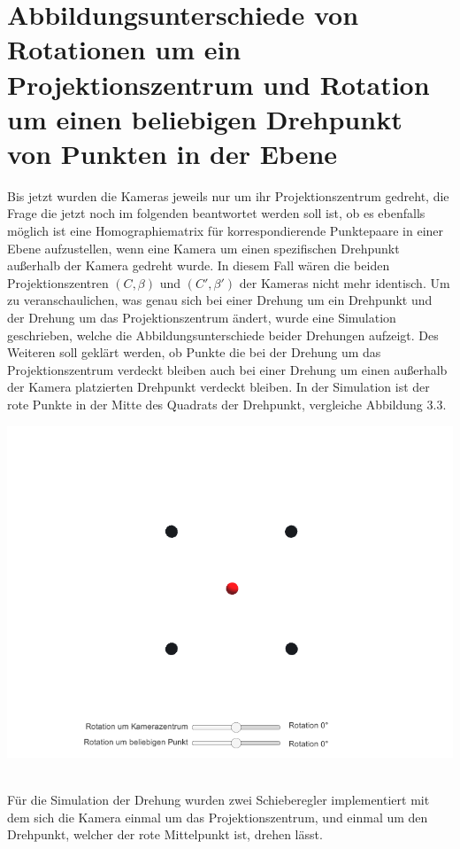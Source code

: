 \section{Abbildungsunterschiede von Rotationen um ein Projektionszentrum und Rotation um einen beliebigen Drehpunkt von Punkten in der Ebene}

Bis jetzt wurden die Kameras jeweils nur um ihr Projektionszentrum gedreht, die Frage die jetzt noch im folgenden beantwortet werden soll ist, ob es ebenfalls möglich ist eine Homographiematrix für korrespondierende Punktepaare in einer Ebene aufzustellen, wenn eine Kamera um einen spezifischen Drehpunkt außerhalb der Kamera gedreht wurde. In diesem Fall wären die beiden Projektionszentren $(C,\beta)$ und $(C',\beta')$ der Kameras nicht mehr identisch. Um zu veranschaulichen, was genau sich bei einer Drehung um ein Drehpunkt und der Drehung um das Projektionszentrum ändert, wurde eine Simulation geschrieben, welche die Abbildungsunterschiede beider Drehungen aufzeigt. Des Weiteren soll geklärt werden, ob Punkte die bei der Drehung um das Projektionszentrum verdeckt bleiben auch bei einer Drehung um einen außerhalb der Kamera platzierten Drehpunkt verdeckt bleiben. In der Simulation ist der rote Punkte in der Mitte des Quadrats der Drehpunkt, vergleiche Abbildung 3.3. 

\begin{minipage}{\linewidth}
	\centering
	\includegraphics[width=.8\linewidth]{images/Ausgangslage.png}
\end{minipage}\\


Für die Simulation der Drehung wurden zwei Schieberegler implementiert mit dem sich die Kamera einmal um das Projektionszentrum, und einmal um den Drehpunkt, welcher der rote Mittelpunkt ist, drehen lässt.


